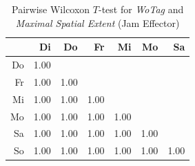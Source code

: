 





    \begin{table}[ht!]
        \tiny
        \centering
        \begin{tabular}{rrrrrrr}
            \toprule
                & Di & Do & Fr & Mi & Mo & Sa \\ 
            \midrule
            Do & 1.00 &  &  &  &  &  \\ 
            Fr & 1.00 & 1.00 &  &  &  &  \\ 
            Mi & 1.00 & 1.00 & 1.00 &  &  &  \\ 
            Mo & 1.00 & 1.00 & 1.00 & 1.00 &  &  \\ 
            Sa & 1.00 & 1.00 & 1.00 & 1.00 & 1.00 &  \\ 
            So & 1.00 & 1.00 & 1.00 & 1.00 & 1.00 & 1.00 \\ 
            \bottomrule
            \end{tabular}
        \caption{Pairwise Wilcoxon $T$-test for \textit{WoTag} and \textit{Maximal Spatial Extent} (Jam Effector)}
        \label{tbl:wilcoxon_baysis_effector_WoTag_TMax}
    \end{table}

